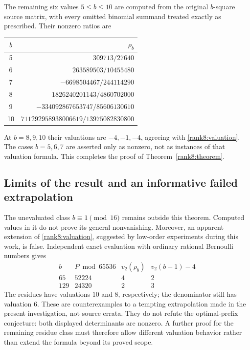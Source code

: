 The remaining six values $5\le b\le10$ are computed from the
original $b$-square source matrix, with every omitted binomial
summand treated exactly as prescribed.  Their nonzero ratios are
\begin{center}
\begin{tabular}{c r}
\hline
$b$ & $\rho_b$\\
\hline
5 & $309713/27640$\\
6 & $263589503/10455480$\\
7 & $-6698504467/244114290$\\
8 & $1826240201143/4860702000$\\
9 & $-334092867653747/85606130610$\\
10 & $711292958938006619/13975082830800$\\
\hline
\end{tabular}
\end{center}
At $b=8,9,10$ their valuations are $-4,-1,-4$, agreeing with
\eqref{rank8:valuation}.  The cases $b=5,6,7$ are asserted only
as nonzero, not as instances of that valuation formula.
This completes the proof of Theorem~\ref{rank8:theorem}.

\subsection{Limits of the result and an informative failed extrapolation}

The unevaluated class $b\equiv1\pmod {16}$ remains outside this
theorem.  Computed values in it do not prove its general nonvanishing.
Moreover, an apparent extension of \eqref{rank8:valuation}, suggested
by low-order experiments during this work, is false.  Independent
exact evaluation with ordinary rational Bernoulli numbers gives
\[
 \begin{array}{c|c|c|c}
 b&P\bmod 65536&v_2(\rho_b)&v_2(b-1)-4\\\hline
 65&52224&4&2\\
 129&24320&2&3
 \end{array}
\]
The residues have valuations $10$ and $8$, respectively; the
denominator still has valuation $6$.  These are counterexamples
to a tempting extrapolation made in the present investigation,
not source errata.  They do not refute the optimal-prefix conjecture:
both displayed determinants are nonzero.  A further proof for the
remaining residue class must therefore allow different valuation
behavior rather than extend the formula beyond its proved scope.
